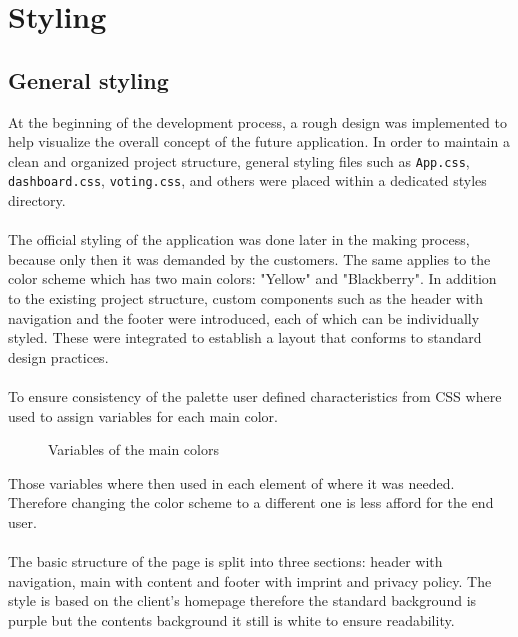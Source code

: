 \documentclass[a4paper,12pt]{report}
\begin{document}
\section{Styling}
\subsection{General styling}
At the beginning of the development process, a rough design was implemented to help visualize the overall concept of the future application. In order to maintain a clean and organized project structure, general styling files such as \texttt{App.css}, \texttt{dashboard.css}, \texttt{voting.css}, and others were placed within a dedicated styles directory.\\\\
The official styling of the application was done later in the making process, because only then it was demanded by the customers. The same applies to the color scheme which has two main colors: "Yellow" and "Blackberry". In addition to the existing project structure, custom components such as the header with navigation and the footer were introduced, each of which can be individually styled. These were integrated to establish a layout that conforms to standard design practices.\\\\
To ensure consistency of the palette user defined characteristics from CSS where used to assign variables for each main color. \parencite{csscolorvariables}
\begin{figure}[h!]
	\caption{Variables of the main colors}
	\label{fig:user_defined_characteristics}
\end{figure}
Those variables where then used in each element of where it was needed. Therefore changing the color scheme to a different one is less afford for the end user. \\ \\
The basic structure of the page is split into three sections: header with navigation, main with content and footer with imprint and privacy policy. The style is based on the client's homepage therefore the standard background is purple but the contents background it still is white to ensure readability. \parencite{lmppage} \\
\end{document}

